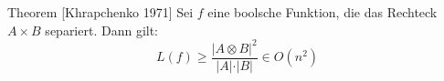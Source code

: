 \begin{frame}
    \begin{block}{Theorem [Khrapchenko 1971]}
        Sei $f$ eine boolsche Funktion, die das Rechteck $A \times B$ separiert. Dann gilt:
        \[
            L(f) \geq \frac{\vert A \otimes B\vert ^2}{\vert A \vert\cdot\vert B\vert} \in O(n^2)
        \]
    \end{block}
\end{frame}

